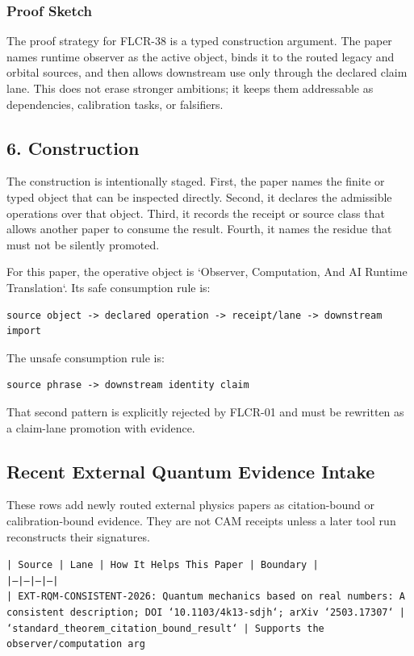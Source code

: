 \documentclass[11pt]{article}
\begin{document}
\subsubsection*{Proof Sketch}

The proof strategy for FLCR-38 is a typed construction argument. The paper names runtime observer as the active object, binds it to the routed legacy and orbital sources, and then allows downstream use only through the declared claim lane. This does not erase stronger ambitions; it keeps them addressable as dependencies, calibration tasks, or falsifiers.

\subsection*{6. Construction}

The construction is intentionally staged. First, the paper names the finite or
typed object that can be inspected directly. Second, it declares the admissible
operations over that object. Third, it records the receipt or source class that
allows another paper to consume the result. Fourth, it names the residue that
must not be silently promoted.

For this paper, the operative object is `Observer, Computation, And AI Runtime Translation`. Its safe consumption
rule is:

\begin{verbatim}
source object -> declared operation -> receipt/lane -> downstream import
\end{verbatim}

The unsafe consumption rule is:

\begin{verbatim}
source phrase -> downstream identity claim
\end{verbatim}

That second pattern is explicitly rejected by FLCR-01 and must be rewritten as
a claim-lane promotion with evidence.

\subsection*{Recent External Quantum Evidence Intake}

These rows add newly routed external physics papers as citation-bound or calibration-bound evidence. They are not CAM receipts unless a later tool run reconstructs their signatures.

\noindent\texttt{| Source | Lane | How It Helps This Paper | Boundary |}\\
\noindent\texttt{|---|---|---|---|}\\
\noindent\texttt{| EXT-RQM-CONSISTENT-2026: Quantum mechanics based on real numbers: A consistent description; DOI `10.1103/4k13-sdjh`; arXiv `2503.17307` | `standard\_theorem\_citation\_bound\_result` | Supports the observer/computation arg}\\
\end{document}
